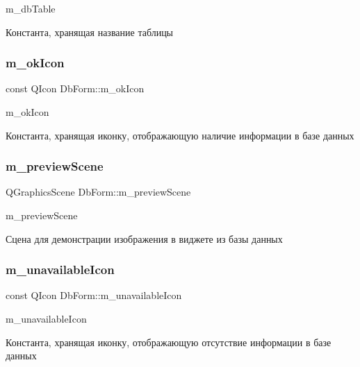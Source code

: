m\+\_\+db\+Table 

Константа, хранящая название таблицы \mbox{\label{classDbForm_a8231b5e3687e61e8b3391040f99f33fe}} 
\subsubsection{\texorpdfstring{m\+\_\+ok\+Icon}{m\_okIcon}}
{\footnotesize\ttfamily const Q\+Icon Db\+Form\+::m\+\_\+ok\+Icon\hspace{0.3cm}{\ttfamily [private]}}



m\+\_\+ok\+Icon 

Константа, хранящая иконку, отображающую наличие информации в базе данных \mbox{\label{classDbForm_a2f5838603cedc772f92fc47cd484c93a}} 
\subsubsection{\texorpdfstring{m\+\_\+preview\+Scene}{m\_previewScene}}
{\footnotesize\ttfamily Q\+Graphics\+Scene Db\+Form\+::m\+\_\+preview\+Scene\hspace{0.3cm}{\ttfamily [private]}}



m\+\_\+preview\+Scene 

Сцена для демонстрации изображения в виджете из базы данных \mbox{\label{classDbForm_a664eef6253a7345bd09b820346c0e3c9}} 
\subsubsection{\texorpdfstring{m\+\_\+unavailable\+Icon}{m\_unavailableIcon}}
{\footnotesize\ttfamily const Q\+Icon Db\+Form\+::m\+\_\+unavailable\+Icon\hspace{0.3cm}{\ttfamily [private]}}



m\+\_\+unavailable\+Icon 

Константа, хранящая иконку, отображающую отсутствие информации в базе данных \mbox{\label{classDbForm_ac2f11a495462056b06da8e3d62a04c22}} 
